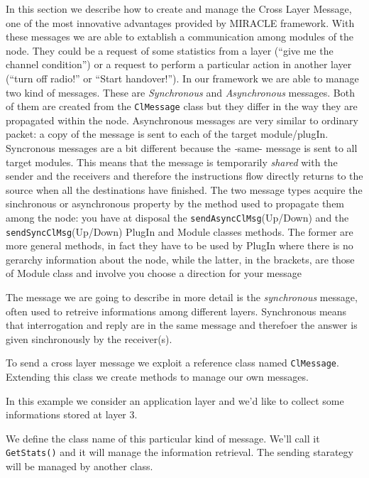 \documentclass[a4paper,10pt]{article}
\begin{document}
In this section we describe how to create and manage the Cross Layer Message, one of the most innovative advantages provided by MIRACLE framework. With these messages we are able to extablish a communication among modules of the node. They could be a request of some statistics from a layer (``give me the channel condition'') or a request to perform a particular action in another layer (``turn off radio!'' or ``Start handover!'').
In our framework we are able to manage two kind of messages. These are \emph{Synchronous} and \emph{Asynchronous} messages. Both of them are created from the \verb=ClMessage= class but they differ in the way they are propagated within the node. Asynchronous messages are very similar to ordinary packet: a copy of the message is sent to each of the target module/plugIn. Syncronous messages are a bit different because the \emph-same- message is sent to all target modules. This means that the message is temporarily \emph{shared} with the sender and the receivers and therefore the instructions flow directly returns to the source when all the destinations have finished.
The two message types acquire the sinchronous or asynchronous property by the method used to propagate them among the node: you have at disposal the \verb-sendAsyncClMsg-(Up/Down) and the \verb-sendSyncClMsg-(Up/Down) PlugIn and Module classes methods. The former are more general methods, in fact they have to be used by PlugIn where there is no gerarchy information about the node, while the latter, in the brackets, are those of Module class and involve you choose a direction for your message

The message we are going to describe in more detail is the \emph{synchronous} message, often used to retreive informations among different layers. Synchronous means that interrogation and reply are in the same message and therefoer the answer is given sinchronously by the receiver(s).

To send a cross layer message we exploit a reference class named \verb=ClMessage=. Extending this class we create methods to manage our own messages.

In this example we consider an application layer and we'd like to collect some informations stored at layer 3.

We define the class name of this particular kind of message. We'll call it \verb=GetStats()= and it will manage the information retrieval. The sending starategy will be managed by another class.
\end{document}
